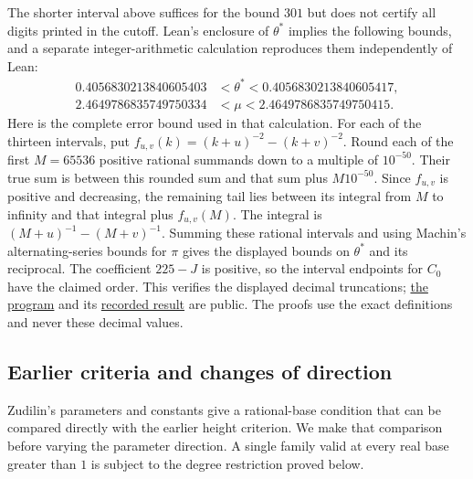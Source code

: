 The shorter interval above suffices for the bound $301$ but does not
certify all digits printed in the cutoff. Lean's enclosure of $\theta^*$
implies the following bounds, and a separate integer-arithmetic
calculation reproduces them independently of Lean:
\[
\begin{aligned}
0.4056830213840605403&<\theta^*<0.4056830213840605417,\\
2.4649786835749750334&<\mu<2.4649786835749750415.
\end{aligned}
\]
Here is the complete error bound used in that calculation. For each of the thirteen
intervals, put $f_{u,v}(k)=(k+u)^{-2}-(k+v)^{-2}$.
Round each of the first $M=65536$ positive rational summands down to a
multiple of $10^{-50}$. Their true sum is between this rounded sum and
that sum plus $M10^{-50}$. Since $f_{u,v}$ is positive and decreasing,
the remaining tail lies between its integral from $M$ to infinity
and that integral plus $f_{u,v}(M)$. The integral is
$(M+u)^{-1}-(M+v)^{-1}$. Summing these rational intervals and using
Machin's alternating-series bounds for $\pi$ gives the displayed
bounds on $\theta^*$ and its reciprocal. The coefficient
$225-J$ is positive, so the interval endpoints for $C_0$ have the
claimed order. This verifies the displayed decimal truncations; \href{https://github.com/wcook04/plectis-erdos/blob/4beca4ad0c00a626def9c73f2420e20ebf8d1968/research/experiments/erdos1049/threshold_digits.py}{the program} and
its \href{https://github.com/wcook04/plectis-erdos/blob/4beca4ad0c00a626def9c73f2420e20ebf8d1968/research/experiments/erdos1049/receipts/threshold-digits.json}{recorded result} are public. The proofs use the exact definitions and never these decimal values.

\subsection{Earlier criteria and changes of direction}\label{long1049:sec:region-extensions}

Zudilin's parameters and constants give a rational-base condition
that can be compared directly with the earlier height criterion.
We make that comparison before varying the parameter direction.
A single family valid at every real base greater than $1$ is subject
to the degree restriction proved below.

